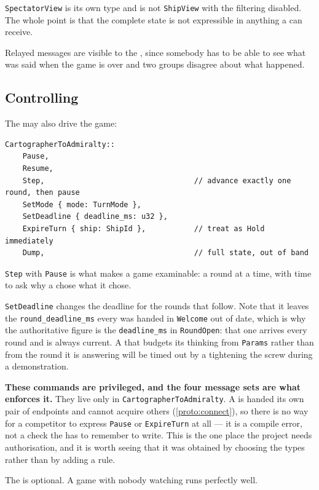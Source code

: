 \documentclass{article}
\begin{document}
\texttt{SpectatorView} is its own type and is not \texttt{ShipView} with the filtering disabled.
The whole point is that the complete state is not expressible in anything a \ship{} can receive.

Relayed messages are visible to the \cartographer, since somebody has to be able to see what was
said when the game is over and two groups disagree about what happened.

\subsection{Controlling}

The \cartographer{} may also drive the game:

\begin{lstlisting}
CartographerToAdmiralty::
    Pause,
    Resume,
    Step,                                  // advance exactly one round, then pause
    SetMode { mode: TurnMode },
    SetDeadline { deadline_ms: u32 },
    ExpireTurn { ship: ShipId },           // treat as Hold immediately
    Dump,                                  // full state, out of band
\end{lstlisting}

\texttt{Step} with \texttt{Pause} is what makes a game examinable: a round at a time, with time to
ask why a \ship{} chose what it chose.

\texttt{SetDeadline} changes the deadline for the rounds that follow. Note that it leaves the
\texttt{round\_deadline\_ms} every \ship{} was handed in \texttt{Welcome} out of date, which is
why the authoritative figure is the \texttt{deadline\_ms} in \texttt{RoundOpen}: that one arrives
every round and is always current. A \ship{} that budgets its thinking from \texttt{Params} rather
than from the round it is answering will be timed out by a \cartographer{} tightening the screw
during a demonstration.

\textbf{These commands are privileged, and the four message sets are what enforces it.} They live
only in \texttt{CartographerToAdmiralty}. A \ship{} is handed its own pair of endpoints
and cannot acquire others (\cref{proto:connect}), so there is no way for a competitor to express
\texttt{Pause} or \texttt{ExpireTurn} at all --- it is a compile error, not a check the
\admiralty{} has to remember to write. This is the one place the project needs authorisation, and
it is worth seeing that it was obtained by choosing the types rather than by adding a rule.

The \cartographer{} is optional. A game with nobody watching runs perfectly well.
\end{document}
